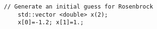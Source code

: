 \begin{lstlisting}[style=C++]
    // Generate an initial guess for Rosenbrock
    std::vector <double> x(2);
    x[0]=-1.2; x[1]=1.;
\end{lstlisting}

